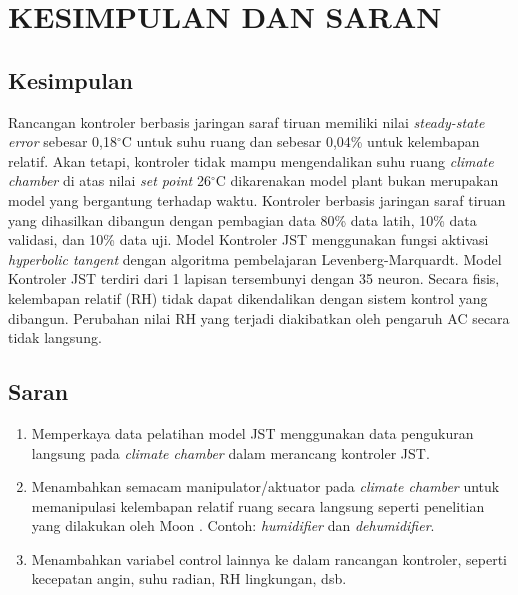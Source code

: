 \chapter{KESIMPULAN DAN SARAN}
\label{kesimpulan-dan-saran}

\section{Kesimpulan}
Rancangan kontroler berbasis jaringan saraf tiruan memiliki nilai \textit{steady-state error} sebesar 0,18$^\circ$C untuk suhu ruang dan sebesar 0,04\% untuk kelembapan relatif. Akan tetapi, kontroler tidak mampu mengendalikan suhu ruang \textit{climate chamber} di atas nilai \textit{set point} 26$^\circ$C dikarenakan model plant\cite{skripsiTanto} bukan merupakan model yang bergantung terhadap waktu. Kontroler berbasis jaringan saraf tiruan yang dihasilkan dibangun dengan pembagian data 80\% data latih, 10\% data validasi, dan 10\% data uji. Model Kontroler JST menggunakan fungsi aktivasi \textit{hyperbolic tangent} dengan algoritma pembelajaran Levenberg-Marquardt. Model Kontroler JST terdiri dari 1 lapisan tersembunyi dengan 35 neuron. Secara fisis, kelembapan relatif (RH) tidak dapat dikendalikan dengan sistem kontrol yang dibangun. Perubahan nilai RH yang terjadi diakibatkan oleh pengaruh AC secara tidak langsung.

\section{Saran}

\begin{enumerate}
	\item Memperkaya data pelatihan model JST menggunakan data pengukuran langsung pada \textit{climate chamber} dalam merancang kontroler JST.
	\item Menambahkan semacam manipulator/aktuator pada \textit{climate chamber} untuk memanipulasi kelembapan relatif ruang secara langsung seperti penelitian yang dilakukan oleh Moon \cite{paper22JJkim}. Contoh: \textit{humidifier} dan \textit{dehumidifier}.
	\item Menambahkan variabel control lainnya ke dalam rancangan kontroler, seperti kecepatan angin, suhu radian, RH lingkungan, dsb.
\end{enumerate}